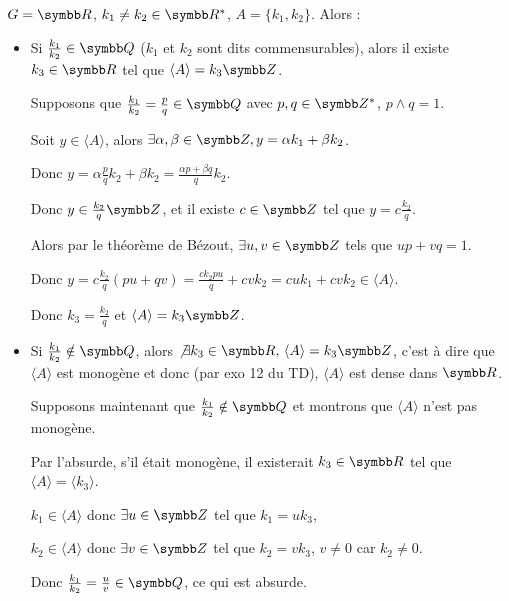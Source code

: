 \begin{exemple}
    $G = \R$, $k_1 \neq k_2 \in \R^*$, $A = \{k_1, k_2\}$. Alors : 

    \begin{itemize}
        \item Si $\frac{k_1}{k_2} \in \Q$ ($k_1$ et $k_2$ sont dits commensurables), alors il existe 
        $k_3 \in \R$ tel que $\langle A \rangle = k_3 \Z$.

        \svspace Supposons que $\frac{k_1}{k_2} = \frac p q \in \Q$ avec $p, q \in \Z^*$, $p \wedge q = 1$.

        Soit $y \in \langle A \rangle$, alors $\exists \alpha, \beta \in \Z, y = \alpha k_1 + \beta k_2$.

        Donc $\displaystyle y = \alpha \frac p q k_2 + \beta k_2 = \frac{\alpha p + \beta q} q k_2$.

        Donc $y \in \frac{k_2} q \Z$, et il existe $c \in \Z$ tel que $\displaystyle y = c \frac{k_2} q$.

        Alors par le théorème de Bézout, $\exists u, v \in \Z$ tels que $up + vq = 1$.

        Donc $\displaystyle y = c \frac{k_2} q (pu + qv) = \frac{c k_2 p u}{q} + cv k_2 = c u k_1 + cv k_2 \in \langle A \rangle$.

        Donc $k_3 = \frac{k_2} q$ et $\langle A \rangle = k_3 \Z$.

        \item Si $\frac{k_1}{k_2} \notin \Q$, alors $\not \exists k_3 \in \R, \, \langle A \rangle = k_3 \Z$, 
        c'est à dire que $\langle A \rangle$ est monogène et donc (par exo 12 du TD), 
        $\langle A \rangle$ est dense dans $\R$.

        \svspace Supposons maintenant que $\frac{k_1}{k_2} \notin \Q$ et montrons 
        que $\langle A \rangle$ n'est pas monogène.

        Par l'absurde, s'il était monogène, il existerait $k_3 \in \R$ tel que
        $\langle A \rangle = \langle k_3 \rangle$. 

        $k_1 \in \langle A \rangle$ donc $\exists u \in \Z$ tel que $k_1 = u k_3$, 

        $k_2 \in \langle A \rangle$ donc $\exists v \in \Z$ tel que $k_2 = v k_3$, $v \neq 0$ car $k_2 \neq 0$.

        Donc $\frac{k_1}{k_2} = \frac u v \in \Q$, ce qui est absurde.
    \end{itemize}
\end{exemple}

